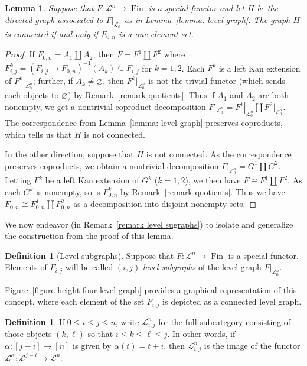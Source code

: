 \documentclass{amsart}
\numberwithin{theorem}{subsection}
\newtheorem{lemma}[theorem]{Lemma}
\theoremstyle{definition}
\newtheorem{definition}[theorem]{Definition}
\newcommand{\finset}{\operatorname{Fin}}
\newcommand{\scriptyell}{\mathscr L}
\begin{document}
\begin{lemma}\label{lemma F0n connected}
Suppose that $F\colon \scriptyell^n \to \finset$ is a special functor and let $H$ be the directed graph associated to $F|_{\scriptyell^{n}_0}$ as in Lemma~\ref{lemma: level graph}.
The graph $H$ is connected if and only if $F_{0,n}$ is a one-element set.
\end{lemma}
\begin{proof}
If $F_{0,n} = A_1 \amalg A_2$, then $F = F^1 \amalg F^2$ where $F^k_{i,j} = (F_{i,j} \to F_{0,n})^{-1}(A_k) \subseteq F_{i,j}$ for $k=1,2$.
Each $F^k$ is a left Kan extension of $F^k|_{\scriptyell^{n}_0}$; further, if $A_k \neq \varnothing$, then $F^k|_{\scriptyell^{n}_0}$ is not the trivial functor (which sends each objects to $\varnothing$) by Remark~\ref{remark quotients}.
Thus if $A_1$ and $A_2$ are both nonempty, we get a nontrivial coproduct decomposition $F|_{\scriptyell^{n}_0} = F^1|_{\scriptyell^{n}_0} \amalg F^2|_{\scriptyell^{n}_0}$.
The correspondence from Lemma~\ref{lemma: level graph} preserves coproducts, which tells us that $H$ is not connected.

In the other direction, suppose that $H$ is not connected.
As the correspondence preserves coproducts, we obtain a nontrivial decomposition $F|_{\scriptyell^{n}_0} = G^1 \amalg G^2$.
Letting $F^k$ be a left Kan extension of $G^k$ ($k=1,2$), we then have $F \cong F^1 \amalg F^2$.
As each $G^k$ is nonempty, so is $F^k_{0,n}$ by Remark~\ref{remark quotients}.
Thus we have $F_{0,n} \cong F^1_{0,n} \amalg F^2_{0,n}$ as a decomposition into disjoint nonempty sets.
\end{proof}


We now endeavor (in Remark~\ref{remark level sugraphs}) to isolate and generalize the construction from the proof of this lemma.

\begin{definition}[Level subgraphs]\label{definition level subgraph}
Suppose that $F\colon \scriptyell^n \to \finset$ is a special functor.
Elements of $F_{i,j}$ will be called $(i,j)$-\emph{level subgraphs} of the level graph $F|_{\scriptyell^{n}_0}$.
\end{definition}

Figure~\ref{figure height four level graph} provides a graphical representation of this concept, 
where each element of the set $F_{i,j}$ is depicted as a connected level graph.

\begin{definition}\label{partial scriptyell}
If $0 \leq i \leq j \leq n$, write $\scriptyell^{n}_{i,j}$ for the full subcategory consisting of those objects $(k,\ell)$ so that $i \leq k \leq \ell \leq j$.
In other words, if $\alpha \colon [j-i] \to [n]$ is given by $\alpha(t) = t+i$, then $\scriptyell^{n}_{i,j}$ is the image of the functor $\scriptyell^{\alpha} \colon \scriptyell^{j-i} \to \scriptyell^n$.
\end{definition}
\end{document}
